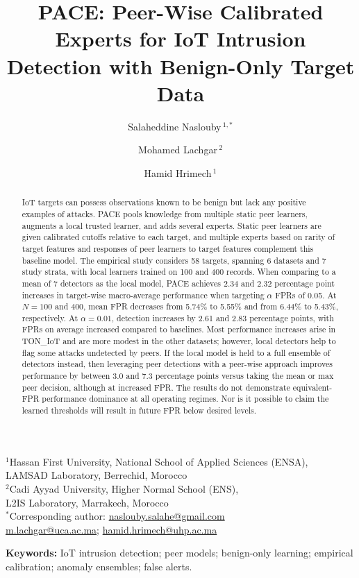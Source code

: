 \documentclass[11pt]{article}
\title{PACE: Peer-Wise Calibrated Experts for IoT Intrusion Detection with Benign-Only Target Data}
\author{Salaheddine Naslouby\,\orcidlink{0009-0002-7295-7816}$^{1,*}$ \and Mohamed Lachgar\,\orcidlink{0000-0002-6155-3309}$^2$ \and Hamid Hrimech\,\orcidlink{0000-0002-3980-1214}$^1$}
\date{}
\begin{document}
\maketitle
\begin{center}\small
$^1$Hassan First University, National School of Applied Sciences (ENSA),\\
LAMSAD Laboratory, Berrechid, Morocco\\[3pt]
$^2$Cadi Ayyad University, Higher Normal School (ENS),\\
L2IS Laboratory, Marrakech, Morocco\\[5pt]
$^*$Corresponding author: \href{mailto:naslouby.salahe@gmail.com}{naslouby.salahe@gmail.com}\\
\href{mailto:m.lachgar@uca.ac.ma}{m.lachgar@uca.ac.ma};
\href{mailto:hamid.hrimech@uhp.ac.ma}{hamid.hrimech@uhp.ac.ma}
\end{center}
\begin{abstract}
IoT targets can possess observations known to be benign but lack any positive examples of attacks. PACE pools knowledge from multiple static peer learners, augments a local trusted learner, and adds several experts. Static peer learners are given calibrated cutoffs relative to each target, and multiple experts based on rarity of target features and responses of peer learners to target features complement this baseline model. The empirical study considers 58 targets, spanning 6 datasets and 7 study strata, with local learners trained on 100 and 400 records. When comparing to a mean of 7 detectors as the local model, PACE achieves 2.34 and 2.32 percentage point increases in target-wise macro-average performance when targeting $\alpha$ FPRs of 0.05. At $N=100$ and 400, mean FPR decreases from 5.74\% to 5.55\% and from 6.44\% to 5.43\%, respectively. At $\alpha=0.01$, detection increases by 2.61 and 2.83 percentage points, with FPRs on average increased compared to baselines. Most performance increases arise in TON\_IoT and are more modest in the other datasets; however, local detectors help to flag some attacks undetected by peers. If the local model is held to a full ensemble of detectors instead, then leveraging peer detections with a peer-wise approach improves performance by between 3.0 and 7.3 percentage points versus taking the mean or max peer decision, although at increased FPR. The results do not demonstrate equivalent-FPR performance dominance at all operating regimes. Nor is it possible to claim the learned thresholds will result in future FPR below desired levels.
\end{abstract}
\noindent\textbf{Keywords:} IoT intrusion detection; peer models; benign-only learning; empirical calibration; anomaly ensembles; false alerts.




\FloatBarrier





\ifdefined\withsupplement
\clearpage
\appendix
\renewcommand{\theHtable}{\Alph{section}.\arabic{table}}
\renewcommand{\thetable}{\Alph{section}.\arabic{table}}

\fi
\end{document}
